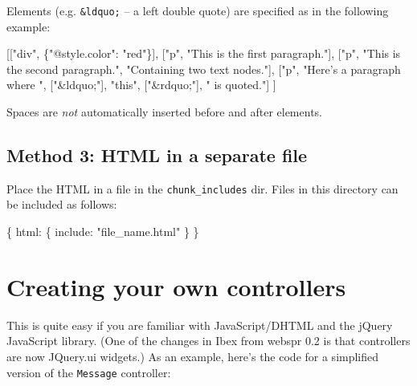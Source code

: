 \documentclass[]{article}
\newenvironment{Shaded}{}{}
\newcommand{\DataTypeTok}[1]{\textcolor[rgb]{0.56,0.13,0.00}{{#1}}}
\newcommand{\StringTok}[1]{\textcolor[rgb]{0.25,0.44,0.63}{{#1}}}
\newcommand{\NormalTok}[1]{{#1}}
\begin{document}
Elements (e.g. \texttt{\&ldquo;} -- a left double quote) are specified
as in the following example:

\begin{Shaded}
\begin{Highlighting}[]
    \NormalTok{[[}\StringTok{"div"}\NormalTok{, \{}\StringTok{"@style.color"}\NormalTok{: }\StringTok{"red"}\NormalTok{\}],}
        \NormalTok{[}\StringTok{"p"}\NormalTok{, }\StringTok{"This is the first paragraph."}\NormalTok{],}
        \NormalTok{[}\StringTok{"p"}\NormalTok{, }\StringTok{"This is the second paragraph."}\NormalTok{, }\StringTok{"Containing two text nodes."}\NormalTok{],}
        \NormalTok{[}\StringTok{"p"}\NormalTok{, }\StringTok{"Here's a paragraph where "}\NormalTok{, [}\StringTok{"&ldquo;"}\NormalTok{], }\StringTok{"this"}\NormalTok{, [}\StringTok{"&rdquo;"}\NormalTok{], }\StringTok{" is quoted."}\NormalTok{]}
    \NormalTok{]}
\end{Highlighting}
\end{Shaded}

Spaces are \emph{not} automatically inserted before and after elements.

\subsection{Method 3: HTML in a separate
file}\label{method-3-html-in-a-separate-file}

Place the HTML in a file in the \texttt{chunk\_includes} dir. Files in
this directory can be included as follows:

\begin{Shaded}
\begin{Highlighting}[]
    \NormalTok{\{ }\DataTypeTok{html}\NormalTok{: \{ }\DataTypeTok{include}\NormalTok{: }\StringTok{"file_name.html"} \NormalTok{\} \}}
\end{Highlighting}
\end{Shaded}

\section{Creating your own
controllers}\label{creating-your-own-controllers}

This is quite easy if you are familiar with JavaScript/DHTML and the
jQuery JavaScript library. (One of the changes in Ibex from webspr 0.2
is that controllers are now JQuery.ui widgets.) As an example, here's
the code for a simplified version of the \texttt{Message} controller:
\end{document}
